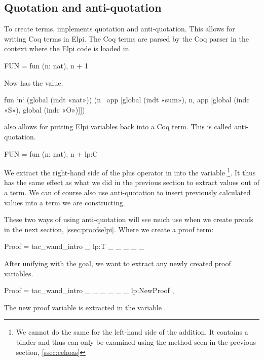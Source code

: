 \documentclass[thesis.tex]{subfiles}
\begin{document}
{{{{\subsection{Quotation and anti-quotation}\label{ssec:ceqoute}
To create terms, \ce implements quotation and anti-quotation. This allows for writing Coq terms in Elpi. The Coq terms are parsed by the Coq parser in the context where the Elpi code is loaded in.
\begin{elpicode}
  FUN = {{ fun (n: nat), n + 1 }}
\end{elpicode}
Now  has the value.
\begin{elpicode}
  fun `n` (global (indt «nat»)) 
            (n \ app [global (indt «sum»), 
                      n, app [global (indc «S»), 
                              global (indc «O»)]])
\end{elpicode}
\ce also allows for putting Elpi variables back into a Coq term. This is called anti-quotation.
\begin{elpicode}
  FUN = {{ fun (n: nat), n + lp:C }}
\end{elpicode}
We extract the right-hand side of the plus operator in  into the variable \footnote{We cannot do the same for the left-hand side of the addition. It contains a binder and thus can only be examined using the method seen in the previous section, \cref{ssec:cehoas}}. It thus has the same effect as what we did in the previous section to extract values out of a term. We can of course also use anti-quotation to insert previously calculated values into a term we are constructing.

These two ways of using anti-quotation will see much use when we create proofs in the next section, \cref{ssec:proofselpi}. Where we create a proof term:
\begin{elpicode}
  Proof = {{ tac_wand_intro _ lp:T _ _ _ _ _ }} 
\end{elpicode}
After unifying  with the goal, we want to extract any newly created proof variables.
\begin{elpicode}[firstnumber=3]
  Proof = {{ tac_wand_intro _ _ _ _ _ _ lp:NewProof }}, 
\end{elpicode}
The new proof variable is extracted in the variable .

}}}}
\end{document}
